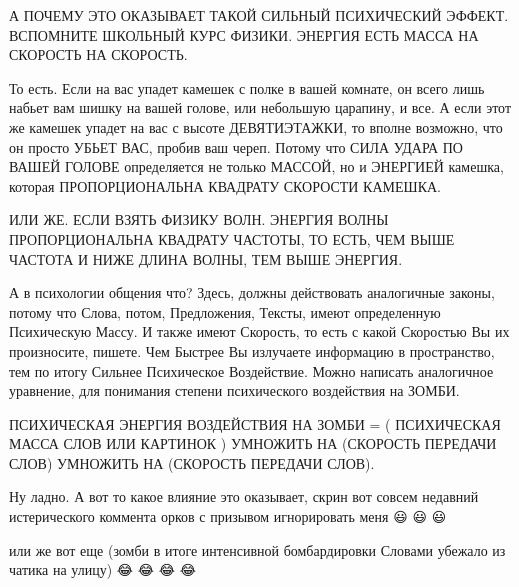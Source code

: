 А ПОЧЕМУ ЭТО ОКАЗЫВАЕТ ТАКОЙ СИЛЬНЫЙ ПСИХИЧЕСКИЙ ЭФФЕКТ. ВСПОМНИТЕ ШКОЛЬНЫЙ
КУРС ФИЗИКИ. ЭНЕРГИЯ ЕСТЬ МАССА НА СКОРОСТЬ НА СКОРОСТЬ. 

То есть. Если на вас упадет камешек с полке в вашей комнате, он всего лишь
набьет вам шишку на вашей голове, или небольшую царапину, и все. А если этот же
камешек упадет на вас с высоте ДЕВЯТИЭТАЖКИ, то вполне возможно, что он просто
УБЬЕТ ВАС, пробив ваш череп. Потому что СИЛА УДАРА ПО ВАШЕЙ ГОЛОВЕ определяется
не только МАССОЙ, но и ЭНЕРГИЕЙ камешка, которая ПРОПОРЦИОНАЛЬНА КВАДРАТУ
СКОРОСТИ КАМЕШКА.

ИЛИ ЖЕ. ЕСЛИ ВЗЯТЬ ФИЗИКУ ВОЛН. ЭНЕРГИЯ ВОЛНЫ ПРОПОРЦИОНАЛЬНА КВАДРАТУ ЧАСТОТЫ,
ТО ЕСТЬ, ЧЕМ ВЫШЕ ЧАСТОТА И НИЖЕ ДЛИНА ВОЛНЫ, ТЕМ ВЫШЕ ЭНЕРГИЯ.

А в психологии общения что? Здесь, должны действовать аналогичные законы,
потому что Слова, потом, Предложения, Тексты, имеют определенную Психическую
Массу. И также имеют Скорость, то есть с какой Скоростью Вы их произносите,
пишете. Чем Быстрее Вы излучаете информацию в пространство, тем по итогу
Сильнее Психическое Воздействие. Можно написать аналогичное уравнение, для
понимания степени психического воздействия на ЗОМБИ.

ПСИХИЧЕСКАЯ ЭНЕРГИЯ ВОЗДЕЙСТВИЯ НА ЗОМБИ = ( ПСИХИЧЕСКАЯ МАССА СЛОВ ИЛИ
КАРТИНОК ) УМНОЖИТЬ НА (СКОРОСТЬ ПЕРЕДАЧИ СЛОВ) УМНОЖИТЬ НА (СКОРОСТЬ ПЕРЕДАЧИ
СЛОВ).

Ну ладно. А вот то какое влияние это оказывает, скрин вот совсем недавний
истерического коммента орков с призывом игнорировать меня 😃 😃 😃 



или же вот еще (зомби в итоге интенсивной бомбардировки Словами убежало из
чатика на улицу) 😂 😂 😂 😂    
